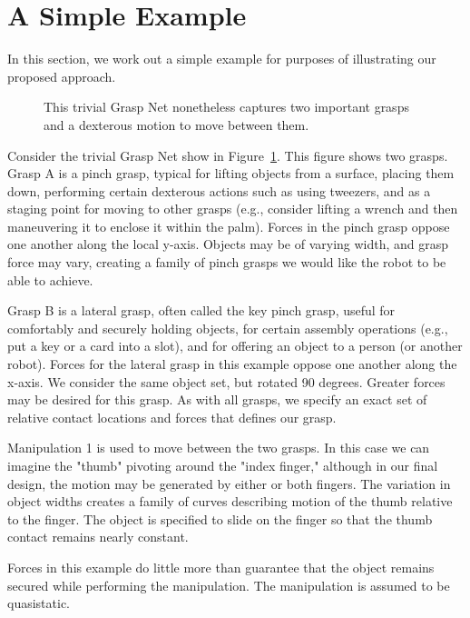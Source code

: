 \section{A Simple Example}

In this section, we work out a simple example for purposes of illustrating our proposed approach.

\begin{figure}
\begin{center}
\vspace*{2in}
\end{center}
\caption[]{This trivial Grasp Net nonetheless captures two important grasps and a dexterous motion to move between them.}
\label{SimpleGraspNet}
\end{figure}

Consider the trivial Grasp Net show in Figure~\ref{SimpleGraspNet}.     This figure shows two grasps.   Grasp A is a pinch grasp, typical for lifting objects from a surface, placing them down, performing certain dexterous actions such as using tweezers, and as a staging point for moving to other grasps (e.g., consider lifting a wrench and then maneuvering it to enclose it within the palm).    Forces in the pinch grasp oppose one another along the local y-axis.   Objects may be of varying width, and grasp force may vary, creating a family of pinch grasps we would like the robot to be able to achieve.

Grasp B is a lateral grasp, often called the key pinch grasp, useful for comfortably and securely holding objects, for certain assembly operations (e.g., put a key or a card into a slot), and for offering an object to a person (or another robot).   Forces for the lateral grasp in this example oppose one another along the x-axis.  We consider the same object set, but rotated 90 degrees.   Greater forces may be desired for this grasp.   As with all grasps, we specify an exact set of relative contact locations and forces that defines our grasp.

Manipulation 1 is used to move between the two grasps.   In this case we can imagine the "thumb" pivoting around the "index finger," although in our final design, the motion may be generated by either or both fingers.    The variation in object widths creates a family of curves describing motion of the thumb relative to the finger.   The object is specified to slide on the finger so that the thumb contact remains nearly constant.

Forces in this example do little more than guarantee that the object remains secured while performing the manipulation.   The manipulation is assumed to be quasistatic.

